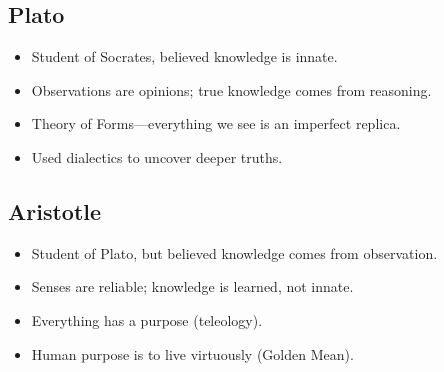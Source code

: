\subsection{Plato}

\begin{itemize}
    \item Student of Socrates, believed knowledge is innate.
    \item Observations are opinions; true knowledge comes from reasoning.
    \item Theory of Forms—everything we see is an imperfect replica.
    \item Used dialectics to uncover deeper truths.
\end{itemize}

\subsection{Aristotle}

\begin{itemize}
    \item Student of Plato, but believed knowledge comes from observation.
    \item Senses are reliable; knowledge is learned, not innate.
    \item Everything has a purpose (teleology).
    \item Human purpose is to live virtuously (Golden Mean).
\end{itemize}

\pagebreak